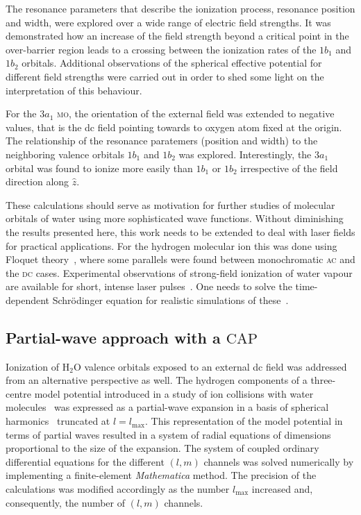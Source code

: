 The resonance parameters that describe the ionization process,
resonance position and width, were explored over a wide range of
electric field strengths. It was demonstrated how an increase of the
field strength beyond a critical point in the over-barrier region
leads to a crossing between the ionization rates of the $1b_{1}$ and
$1b_{2}$ orbitals. Additional observations of the spherical effective
potential for different field strengths were carried out in order to
shed some light on the interpretation of this behaviour.

For the $3a_{1}$ \textsc{mo}, the orientation of the external field
was extended to negative values, that is the dc field pointing towards
to oxygen atom fixed at the origin. The relationship of the resonance
paratemers (position and width) to the neighboring valence orbitals
$1b_{1}$ and $1b_{2}$ was explored. Interestingly, the $3a_{1}$
orbital was found to ionize more easily than $1b_{1}$ or $1b_{2}$
irrespective of the field direction along $\hat{z}$.

These calculations should serve as motivation for further studies of
molecular orbitals of water using more sophisticated wave
functions. Without diminishing the results presented here, this work
needs to be extended to deal with laser fields for practical
applications. For the hydrogen molecular ion this was done using
Floquet theory~\cite{Tsog_H2mol_ac_2013}, where some parallels were
found between monochromatic \textsc{ac} and the \textsc{dc}
cases. Experimental observations of strong-field ionization of water
vapour are available for short, intense laser
pulses~\cite{exp_h2o_laser_2008,exp_h2o_laser_2014}. One needs to
solve the time-dependent Schr\"{o}dinger equation for realistic
simulations of these~\cite{Farrell_2011,Falge_2010}.


\subsection*{Partial-wave approach with a $\mathrm{CAP}$}

Ionization of H$_{2}$O valence orbitals exposed to an external dc
field was addressed from an alternative perspective as well. The
hydrogen components of a three-centre model potential introduced in a
study of ion collisions with water
molecules~\cite{illescas_modelV_2011} was expressed as a partial-wave
expansion in a basis of spherical harmonics~\cite{marko_partialwave}
truncated at $l = l_{\mathrm{max}}$. This representation of the model
potential in terms of partial waves resulted in a system of radial
equations of dimensions proportional to the size of the expansion. The
system of coupled ordinary differential equations for the different
$(l,m)$ channels was solved numerically by implementing a
finite-element \emph{Mathematica} method. The precision of the
calculations was modified accordingly as the number $l_{\mathrm{max}}$
increased and, consequently, the number of $(l,m)$ channels.

